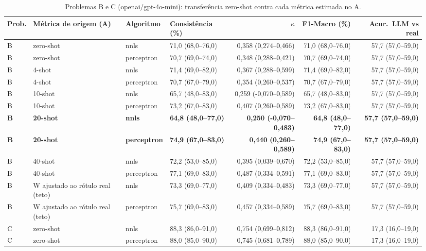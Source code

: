 \begin{table}[htbp]
\centering
\small
\caption{Problemas B e C (openai/gpt-4o-mini): transferência zero-shot contra cada métrica estimada no A.}
\label{tab:T2_BC_gpt4mini}
\begin{tabular}{llllrrr}
\toprule
Prob. & Métrica de origem (A) & Algoritmo & Consistência (\%) & $\kappa$ & F1-Macro (\%) & Acur.\ LLM vs real \\
\midrule
B & zero-shot & nnls & 71,0 (68,0–76,0) & 0,358 (0,274–0,466) & 71,0 (68,0–76,0) & 57,7 (57,0–59,0) \\
B & zero-shot & perceptron & 70,7 (69,0–74,0) & 0,348 (0,288–0,421) & 70,7 (69,0–74,0) & 57,7 (57,0–59,0) \\
B & 4-shot & nnls & 71,4 (69,0–82,0) & 0,367 (0,288–0,599) & 71,4 (69,0–82,0) & 57,7 (57,0–59,0) \\
B & 4-shot & perceptron & 70,7 (67,0–79,0) & 0,354 (0,260–0,537) & 70,7 (67,0–79,0) & 57,7 (57,0–59,0) \\
B & 10-shot & nnls & 65,7 (48,0–83,0) & 0,259 (-0,070–0,589) & 65,7 (48,0–83,0) & 57,7 (57,0–59,0) \\
B & 10-shot & perceptron & 73,2 (67,0–83,0) & 0,407 (0,260–0,589) & 73,2 (67,0–83,0) & 57,7 (57,0–59,0) \\
\textbf{B} & \textbf{20-shot} & \textbf{nnls} & \textbf{64,8 (48,0–77,0)} & \textbf{0,250 (-0,070–0,483)} & \textbf{64,8 (48,0–77,0)} & \textbf{57,7 (57,0–59,0)} \\
\textbf{B} & \textbf{20-shot} & \textbf{perceptron} & \textbf{74,9 (67,0–83,0)} & \textbf{0,440 (0,260–0,589)} & \textbf{74,9 (67,0–83,0)} & \textbf{57,7 (57,0–59,0)} \\
B & 40-shot & nnls & 72,2 (53,0–85,0) & 0,395 (0,039–0,670) & 72,2 (53,0–85,0) & 57,7 (57,0–59,0) \\
B & 40-shot & perceptron & 77,1 (69,0–83,0) & 0,487 (0,334–0,591) & 77,1 (69,0–83,0) & 57,7 (57,0–59,0) \\
B & W ajustado ao rótulo real (teto) & nnls & 73,3 (69,0–77,0) & 0,409 (0,334–0,483) & 73,3 (69,0–77,0) & 57,7 (57,0–59,0) \\
B & W ajustado ao rótulo real (teto) & perceptron & 75,7 (69,0–83,0) & 0,457 (0,334–0,589) & 75,7 (69,0–83,0) & 57,7 (57,0–59,0) \\
\midrule
C & zero-shot & nnls & 88,3 (86,0–91,0) & 0,754 (0,699–0,812) & 88,3 (86,0–91,0) & 17,3 (16,0–19,0) \\
C & zero-shot & perceptron & 88,0 (85,0–90,0) & 0,745 (0,681–0,789) & 88,0 (85,0–90,0) & 17,3 (16,0–19,0) \\

\end{tabular}
\end{table}
